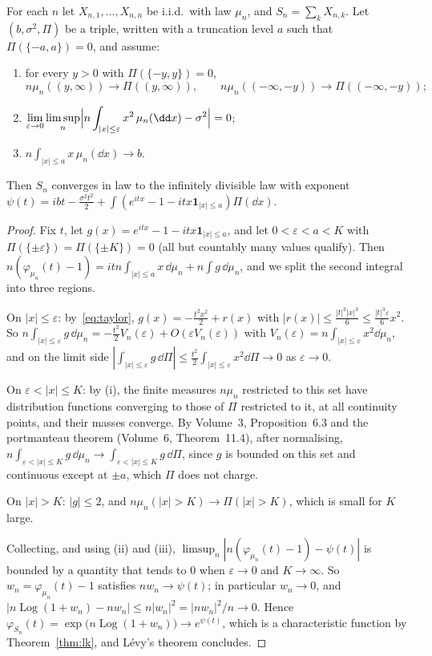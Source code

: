 \begin{theorem}\label{thm:arrays}
For each $n$ let $X_{n,1},\dots,X_{n,n}$ be i.i.d.\ with law $\mu_n$, and $S_n=\sum_kX_{n,k}$. Let $(b,\sigma^2,\Pi)$ be a triple, written with a truncation level
$a$ such that $\Pi(\{-a,a\})=0$, and assume:
\begin{enumerate}[label=(\roman*)]
\item for every $y>0$ with $\Pi(\{-y,y\})=0$,
\[
n\mu_n((y,\infty))\to\Pi((y,\infty)),\qquad n\mu_n((-\infty,-y))\to\Pi((-\infty,-y));
\]
\item $\displaystyle\lim_{\varepsilon\to0}\limsup_n\Bigl|n\int_{|x|\le\varepsilon}x^2\,\mu_n(\dd x)-\sigma^2\Bigr|=0$;
\item $n\int_{|x|\le a}x\,\mu_n(\dd x)\to b$.
\end{enumerate}
Then $S_n$ converges in law to the infinitely divisible law with exponent $\psi(t)=ibt-\frac{\sigma^2t^2}2+\int(e^{itx}-1-itx\mathbf 1_{|x|\le a})\Pi(\dd x)$.
\end{theorem}
\begin{proof}
Fix $t$, let $g(x)=e^{itx}-1-itx\mathbf 1_{|x|\le a}$, and let $0<\varepsilon<a<K$ with $\Pi(\{\pm\varepsilon\})=\Pi(\{\pm K\})=0$ (all but countably many values qualify).
Then $n(\varphi_{\mu_n}(t)-1)=itn\int_{|x|\le a}x\,\dd\mu_n+n\int g\,\dd\mu_n$, and we split the second integral into three regions.

On $|x|\le\varepsilon$: by~\eqref{eq:taylor}, $g(x)=-\frac{t^2x^2}2+r(x)$ with $|r(x)|\le\frac{|t|^3|x|^3}6\le\frac{|t|^3\varepsilon}6x^2$. So
$n\int_{|x|\le\varepsilon}g\,\dd\mu_n=-\frac{t^2}2V_n(\varepsilon)+O(\varepsilon V_n(\varepsilon))$ with $V_n(\varepsilon)=n\int_{|x|\le\varepsilon}x^2\dd\mu_n$, and on the limit side
$|\int_{|x|\le\varepsilon}g\,\dd\Pi|\le\frac{t^2}2\int_{|x|\le\varepsilon}x^2\dd\Pi\to0$ as $\varepsilon\to0$.

On $\varepsilon<|x|\le K$: by (i), the finite measures $n\mu_n$ restricted to this set have distribution functions converging to those of $\Pi$ restricted to
it, at all continuity points, and their masses converge. By Volume~3, Proposition~6.3 and the portmanteau theorem (Volume~6, Theorem~11.4), after
normalising, $n\int_{\varepsilon<|x|\le K}g\,\dd\mu_n\to\int_{\varepsilon<|x|\le K}g\,\dd\Pi$, since $g$ is bounded on this set and continuous except at $\pm a$, which
$\Pi$ does not charge.

On $|x|>K$: $|g|\le2$, and $n\mu_n(|x|>K)\to\Pi(|x|>K)$, which is small for $K$ large.

Collecting, and using (ii) and (iii), $\limsup_n|n(\varphi_{\mu_n}(t)-1)-\psi(t)|$ is bounded by a quantity that tends to $0$ when $\varepsilon\to0$ and $K\to\infty$. So
$w_n=\varphi_{\mu_n}(t)-1$ satisfies $nw_n\to\psi(t)$; in particular $w_n\to0$, and $|n\operatorname{Log}(1+w_n)-nw_n|\le n|w_n|^2=|nw_n|^2/n\to0$. Hence
$\varphi_{S_n}(t)=\exp\bigl(n\operatorname{Log}(1+w_n)\bigr)\to e^{\psi(t)}$, which is a characteristic function by Theorem~\ref{thm:lk}, and L\'evy's theorem concludes.
\end{proof}

